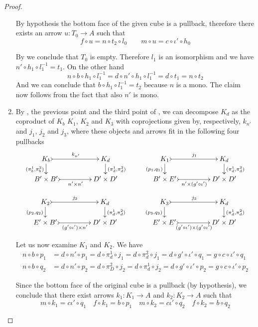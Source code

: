 \documentclass[3p]{elsarticle}
\theoremstyle{remark}
\theoremstyle{definition}
\begin{document}
\begin{proof}
\begin{enumerate}
		By hypothesis the bottom face of the given cube is a pullback, therefore there exists an arrow $u\colon T_0\to A$ such that 
		\[f\circ u=n\circ t_2\circ l_0 \qquad m\circ u=c\circ \iota'\circ h_0\]
		
	By  we conclude that $T_0$ is empty. Therefore $l_1$ is an isomorphism and we have $n'\circ h_1\circ l^{-1}_1=t_1$. On the other hand
\[n\circ b\circ h_1\circ l^{-1}_1=d\circ n'\circ h_1\circ l^{-1}_1=d\circ t_1=n\circ t_2\]
And we can conclude that $b\circ h_1\circ l^{-1}_1=t_2$ because $n$ is a mono. The claim now follows from the fact that  also $n'$ is mono.
		
		\item 	 By , the previous point and the third point of , we can decompose $K_d$ as the coproduct of $K_b$ $K_1$, $K_2$ and $K_3$ with coprojections given by, respectively, $k_{n'}$ and $j_1$, $j_2$ and $j_3$, where these objects and arrows fit in the following four pullbacks
		\[\xymatrix@C=45pt@R=15pt{K_b \ar@{>->}[r]^{k_{n'}}  \ar[d]_{(\pi^1_b, \pi^2_b)}& K_d   \ar[d]^{(\pi^1_d, \pi^2_d)}& K_1 \ar@{>->}[r]^{j_1}  \ar[d]_{(p_1, q_1)} & K_d \ar[d]^{(\pi^1_d, \pi^2_d)} \\
			B'\times B' \ar@{>->}[r]_-{n'\times n'} & D'\times D' & B'\times E' \ar@{>->}[r]_-{n'\times (g'\circ \iota')} & D'\times D'}\]
		\[ \xymatrix@C=45pt@R=15pt{K_2 \ar@{>->}[r]^{j_2}  \ar[d]_{(p_2, q_2)}& K_d   \ar[d]^{(\pi^1_d, \pi^2_d)}& K_3 \ar@{>->}[r]^{j_3}  \ar[d]_{(p_3, q_3)} & K_d \ar[d]^{(\pi^1_d, \pi^2_d)} \\
			E'\times B' \ar@{>->}[r]_-{(g'\circ \iota') \times n'} & D'\times D' & E'\times E' \ar@{>->}[r]_-{(g'\circ \iota')\times (g'\circ \iota')} & D'\times D'}\]

Let us now examine $K_1$ and $K_2$. We have
\begin{align*}
	n\circ b\circ p_1&=d\circ n'\circ p_1=d\circ \pi^1_d\circ j_1=d\circ \pi^2_d\circ j_1=d\circ g'\circ \iota'\circ q_1=g\circ c \circ \iota'\circ q_1\\
	n\circ b\circ q_2 &=d\circ n'\circ p_2=d\circ\pi^2_D\circ j_2
	=d\circ \pi^1_d\circ j_2=d\circ g'\circ \iota'\circ p_2 = g\circ c \circ \iota'\circ p_2
\end{align*}

Since the bottom face of the original cube is a pullback (by hypothesis), we conclude that there exist arrows $k_1\colon  K_1\to A$ and $k_2\colon K_2\to A$ such that
\[m\circ k_1= c \iota'\circ q_1 \quad f\circ k_1=b\circ p_1 \quad m\circ k_2=c \iota'\circ q_2 \quad f\circ k_2=b\circ q_2\]


\end{enumerate}
\end{proof}
\end{document}
